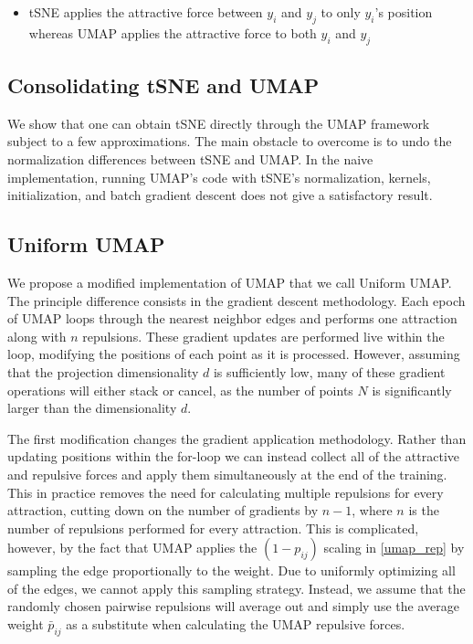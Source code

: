 \documentclass{article}
\theoremstyle{definition}
\begin{document}
\begin{multicols}{2}
\begin{itemize}
    \item tSNE applies the attractive force between $y_i$ and $y_j$ to only $y_i$'s position whereas UMAP applies the attractive force to both $y_i$ and $y_j$
\end{itemize}

\subsection{Consolidating tSNE and UMAP}
We show that one can obtain tSNE directly through the UMAP framework subject to a few approximations. The main obstacle to overcome is to undo the normalization
differences between tSNE and UMAP. In the naive implementation, running UMAP's code with tSNE's normalization, kernels, initialization, and batch gradient
descent does not give a satisfactory result.

\subsection{Uniform UMAP}
We propose a modified implementation of UMAP that we call Uniform UMAP. The principle difference consists in the gradient descent methodology. Each epoch of
UMAP loops through the nearest neighbor edges and performs one attraction along with $n$ repulsions. These gradient updates are performed live within the loop,
modifying the positions of each point as it is processed. However, assuming that the projection dimensionality $d$ is sufficiently low, many of these gradient
operations will either stack or cancel, as the number of points $N$ is significantly larger than the dimensionality $d$.

The first modification changes the gradient application methodology. Rather than updating positions within the for-loop we can instead collect all of the
attractive and repulsive forces and apply them simultaneously at the end of the training. This in practice removes the need for calculating multiple repulsions
for every attraction, cutting down on the number of gradients by $n-1$, where $n$ is the number of repulsions performed for every attraction. This is
complicated, however, by the fact that UMAP applies the $(1 - p_{ij})$ scaling in \ref{umap_rep} by sampling the edge proportionally to the weight. Due to
uniformly optimizing all of the edges, we cannot apply this sampling strategy. Instead, we assume that the randomly chosen pairwise repulsions will average out
and simply use the average weight $\bar{p}_{ij}$ as a substitute when calculating the UMAP repulsive forces.


\end{multicols}
\end{document}
